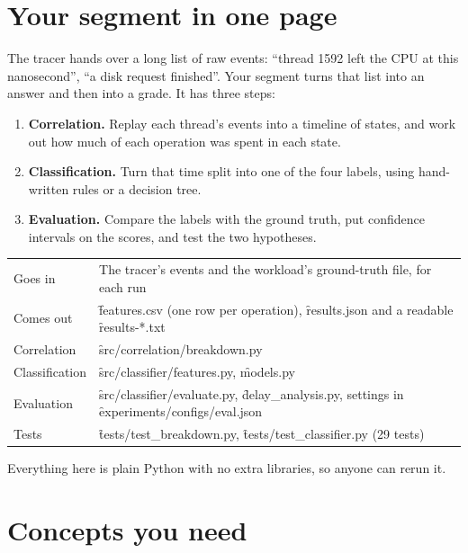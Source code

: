 \documentclass[11pt]{article}
\begin{document}

\section{Your segment in one page}


The tracer hands over a long list of raw events: ``thread 1592 left the CPU at this nanosecond'', ``a disk request finished''. Your segment turns that list into an answer and then into a grade. It has three steps:

\begin{enumerate}
\item \textbf{Correlation.} Replay each thread's events into a timeline of states, and work out how much of each operation was spent in each state.
\item \textbf{Classification.} Turn that time split into one of the four labels, using hand-written rules or a decision tree.
\item \textbf{Evaluation.} Compare the labels with the ground truth, put confidence intervals on the scores, and test the two hypotheses.
\end{enumerate}

\begin{center}
\begin{tabularx}{\textwidth}{@{}lY@{}}
\toprule
Goes in & The tracer's events and the workload's ground-truth file, for each run \\
Comes out & \f{features.csv} (one row per operation), \f{results.json} and a readable \f{results-*.txt} \\
Correlation & \f{src/correlation/breakdown.py} \\
Classification & \f{src/classifier/features.py}, \f{models.py} \\
Evaluation & \f{src/classifier/evaluate.py}, \f{delay\_analysis.py}, settings in \f{experiments/configs/eval.json} \\
Tests & \f{tests/test\_breakdown.py}, \f{tests/test\_classifier.py} (29 tests) \\
\bottomrule
\end{tabularx}
\end{center}

Everything here is plain Python with no extra libraries, so anyone can rerun it.

\section{Concepts you need}
\end{document}
